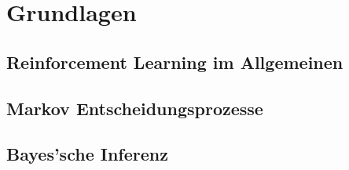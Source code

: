 \section{Grundlagen}
\label{sec:basics}

\subsection{Reinforcement Learning im Allgemeinen}
\label{sec:reinforcement}

\subsection{Markov Entscheidungsprozesse}
\label{sec:markov}

\subsection{Bayes'sche Inferenz}
\label{sec:bayes}